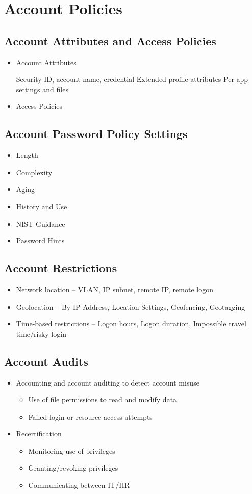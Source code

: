 \section {Account Policies}
	\subsection {Account Attributes and Access Policies}
		\begin{itemize}
		 	\item Account Attributes
		 		\begin{itemize}
					Security ID, account name, credential
					Extended profile attributes
					Per-app settings and files
				\end{itemize}
			\item Access Policies
		\end{itemize}
	\subsection {Account Password Policy Settings}
		\begin{itemize}
			\item Length
			\item Complexity
			\item Aging
			\item History and Use
			\item NIST Guidance
			\item Password Hints
		\end{itemize}
	\subsection {Account Restrictions}
		\begin{itemize}
			\item Network location -- VLAN, IP subnet, remote IP, remote logon
			\item Geolocation -- By IP Address, Location Settings, Geofencing, Geotagging
			\item Time-based restrictions -- Logon hours, Logon duration, Impossible
				travel time/risky login
		\end{itemize}
	\subsection {Account Audits}
		\begin{itemize}
			\item Accounting and account auditing to detect account misuse 
				\begin{itemize}
					\item Use of file permissions to read and modify data
					\item Failed login or resource access attempts
				\end{itemize}
			\item Recertification
				\begin{itemize}
					\item Monitoring use of privileges
					\item Granting/revoking privileges
					\item Communicating between IT/HR
				\end{itemize}
		\end{itemize}
